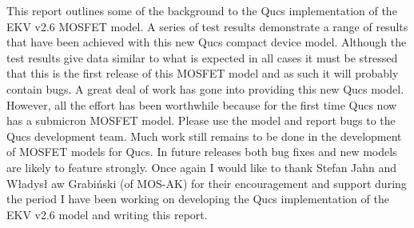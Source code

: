 This report outlines some of the background to the Qucs implementation
of the EKV v2.6 MOSFET model. A series of test results demonstrate a
range of results that have been achieved with this new Qucs compact
device model. Although the test results give data similar to what is
expected in all cases it must be stressed that this is the first
release of this MOSFET model and as such it will probably contain
bugs. A great deal of work has gone into providing this new Qucs
model. However, all the effort has been worthwhile because for the
first time Qucs now has a submicron MOSFET model. Please use the model
and report bugs to the Qucs development team. Much work still remains
to be done in the development of MOSFET models for Qucs. In future
releases both bug fixes and new models are likely to feature
strongly. Once again I would like to thank Stefan Jahn and W\l adys\l
aw Grabi\'{n}ski (of MOS-AK) for their encouragement and support
during the period I have been working on developing the Qucs
implementation of the EKV v2.6 model and writing this report.


